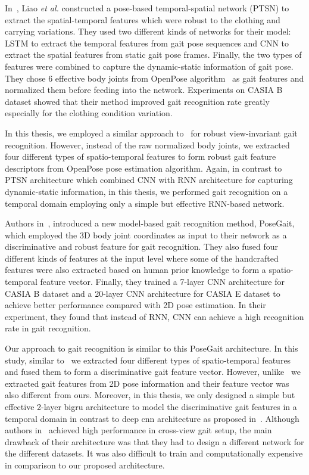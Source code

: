 In~\cite{Liao_17}, Liao \textit{et al.} constructed a pose-based temporal-spatial network (PTSN) to extract the spatial-temporal features which were robust to the clothing and carrying variations. They used two different kinds of networks for their model: LSTM to extract the temporal features from gait pose sequences and CNN to extract the spatial features from static gait pose frames. Finally, the two types of features were combined to capture the dynamic-static information of gait pose. They chose 6 effective body joints from OpenPose algorithm~\cite{Cao_19} as gait features and normalized them before feeding into the network. Experiments on CASIA B dataset showed that their method improved gait recognition rate greatly especially for the clothing condition variation.

In this thesis, we employed a similar approach to~\cite{Liao_17} for robust view-invariant gait recognition. However, instead of the raw normalized body joints, we extracted four different types of spatio-temporal features to form robust gait feature descriptors from OpenPose pose estimation algorithm. Again, in contrast to PTSN architecture which combined CNN with RNN architecture for capturing dynamic-static information, in this thesis, we performed gait recognition on a temporal domain employing only a simple but effective RNN-based network. 

Authors in~\cite{Liao_19}, introduced a new model-based gait recognition method, PoseGait, which employed the 3D body joint coordinates as input to their network as a discriminative and robust feature for gait recognition. They also fused four different kinds of features at the input level where some of the handcrafted features were also extracted based on human prior knowledge to form a spatio-temporal feature vector. Finally, they trained a 7-layer CNN architecture for CASIA B dataset and a 20-layer CNN architecture for CASIA E dataset to achieve better performance compared with 2D pose estimation. In their experiment, they found that instead of RNN, CNN can achieve a high recognition rate in gait recognition.

Our approach to gait recognition is similar to this PoseGait architecture. In this study, similar to~\cite{Liao_19} we extracted four different types of spatio-temporal features and fused them to form a discriminative gait feature vector. However, unlike~\cite{Liao_19} we extracted gait features from 2D pose information and their feature vector was also different from ours. Moreover, in this thesis, we only designed a simple but effective 2-layer \gls{bigru} architecture to model the discriminative gait features in a temporal domain in contrast to deep \gls{cnn} architecture as proposed in~\cite{Liao_19}. Although authors in~\cite{Liao_19} achieved high performance in cross-view gait setup, the main drawback of their architecture was that they had to design a different network for the different datasets. It was also difficult to train and computationally expensive in comparison to our proposed architecture.

